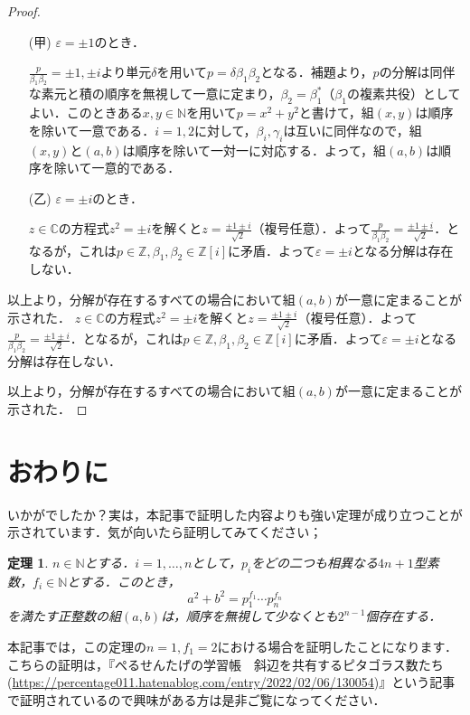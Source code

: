 \documentclass[dvipdfmx]{jsarticle}
\newtheorem*{theorem*}{定理}
\begin{document}
\begin{proof}
\begin{enumerate}
    \item[(甲)] $\varepsilon=\pm1$のとき．\par
    $\frac{p}{\beta_1\beta_2}=\pm1,\pm i$より単元$\delta$を用いて$p=\delta\beta_1\beta_2$となる．補題より，$p$の分解は同伴な素元と積の順序を無視して一意に定まり，$\beta_2=\beta_1^*$（$\beta_1$の複素共役）としてよい．このときある$x,y\in\mathbb{N}$を用いて$p=x^2+y^2$と書けて，組$(x,y)$は順序を除いて一意である．$i=1,2$に対して，$\beta_i,\gamma_i$は互いに同伴なので，組$(x,y)$と$(a,b)$は順序を除いて一対一に対応する．よって，組$(a,b)$は順序を除いて一意的である．
    \item[(乙)] $\varepsilon=\pm i$のとき．\par
    $z\in\mathbb{C}$の方程式$z^2=\pm i$を解くと$z=\frac{\pm1\pm i}{\sqrt{2}}$（複号任意）．よって$\frac{p}{\beta_1\beta_2}=\frac{\pm1\pm i}{\sqrt{2}}$．となるが，これは$p\in\mathbb{Z},\beta_1,\beta_2\in\mathbb{Z}[i]$に矛盾．よって$\varepsilon=\pm i$となる分解は存在しない．
\end{enumerate}
以上より，分解が存在するすべての場合において組$(a,b)$が一意に定まることが示された．
$z\in\mathbb{C}$の方程式$z^2=\pm i$を解くと$z=\frac{\pm1\pm i}{\sqrt{2}}$（複号任意）．よって$\frac{p}{\beta_1\beta_2}=\frac{\pm1\pm i}{\sqrt{2}}$．となるが，これは$p\in\mathbb{Z},\beta_1,\beta_2\in\mathbb{Z}[i]$に矛盾．よって$\varepsilon=\pm i$となる分解は存在しない．

以上より，分解が存在するすべての場合において組$(a,b)$が一意に定まることが示された．
\end{proof}



\section{おわりに}

いかがでしたか？実は，本記事で証明した内容よりも強い定理が成り立つことが示されています．気が向いたら証明してみてください；

\begin{theorem*}

$n\in\mathbb{N}$とする．$i=1,\ldots,n$として，$p_i$をどの二つも相異なる$4n+1$型素数，$f_i\in\mathbb{N}$とする．このとき，
$$a^2+b^2=p_1^{f_1}\cdots p_n^{f_n}$$
を満たす正整数の組$(a,b)$は，順序を無視して少なくとも$2^{n-1}$個存在する．
\end{theorem*}

本記事では，この定理の$n=1,f_1=2$における場合を証明したことになります．こちらの証明は，『ぺるせんたげの学習帳　斜辺を共有するピタゴラス数たち(\url{https://percentage011.hatenablog.com/entry/2022/02/06/130054})』という記事で証明されているので興味がある方は是非ご覧になってください．
\end{document}
